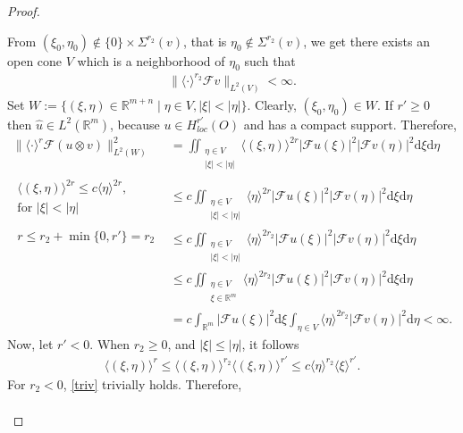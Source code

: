 \documentclass{amsart}
\theoremstyle{definition}
\begin{document}
\begin{proof}
\begin{enumerate}
From $(\xi_0,\eta_0)\notin \{0\} \times \Sigma^{r_2} (v)$, that is $\eta_0 \notin \Sigma^{r_2} (v)$, we get there exists an open cone $V$ which is a neighborhood of $\eta_0$ such that
\begin{align}
\label{eta0}
\lVert \langle\cdot \rangle^{r_2} \mathcal{F} v \rVert_{L^2 (V)}
< \infty.
\end{align}
Set $W:=\{(\xi , \eta) \in \mathbb{R}^{m+n} \mid \eta\in V , |\xi| < |\eta| \}$. Clearly, $(\xi_0,\eta_0)\in W$. If $r'\geq 0$ then $\hat{u}\in L^2 (\mathbb{R}^m)$, because $u\in H_{loc}  ^{r'} (O)$ and has a compact support. Therefore,
\begin{align*}
\lVert \langle \cdot \rangle^{r} \mathcal{F} (u\otimes v)  \rVert_{L^2 (W)} ^2
&= \iint_{\substack{ \eta\in V \\ |\xi|<|\eta| }} \langle (\xi ,\eta) \rangle^{2r} |\mathcal{F}u (\xi)|^2 |\mathcal{F}v (\eta)|^2 \mathrm{d}\xi \mathrm{d}\eta \\
\boxed{\substack{\langle (\xi ,\eta) \rangle^{2r} \leq c \langle \eta \rangle^{2r}, \\ \text{for } |\xi| < |\eta| }}
&\leq c \iint_{\substack{ \eta\in V \\ |\xi|<|\eta| }} \langle \eta \rangle^{2r} |\mathcal{F}u (\xi)|^2 |\mathcal{F}v (\eta)|^2 \mathrm{d}\xi \mathrm{d}\eta\\
\boxed{\substack{ r \leq r_2 + \min \{0,r'\} = r_2 \\ }}
&\leq c \iint_{\substack{ \eta\in V \\ |\xi|<|\eta| }} \langle \eta \rangle^{2r_2} |\mathcal{F}u (\xi)|^2 |\mathcal{F}v (\eta)|^2 \mathrm{d}\xi \mathrm{d}\eta\\
&\leq c \iint_{\substack{ \eta\in V \\ \xi \in \mathbb{R}^m }} \langle \eta \rangle^{2r_2} |\mathcal{F}u (\xi)|^2 |\mathcal{F}v (\eta)|^2 \mathrm{d}\xi \mathrm{d}\eta\\
&= c\int_{\mathbb{R}^m} |\mathcal{F}u (\xi)|^2 \mathrm{d}\xi \int_{\eta\in V} \langle \eta \rangle^{2r_2} |\mathcal{F}v (\eta)|^2 \mathrm{d}\eta
<\infty.
\end{align*}
Now, let $r'<0$. When $r_2 \geq 0 $, and $|\xi|\leq |\eta|$, it follows
\begin{align}
\label{triv}
\langle ( \xi , \eta ) \rangle^r
\leq \langle ( \xi , \eta ) \rangle^{r_2} \langle ( \xi , \eta ) \rangle^{r'}
\leq c \langle \eta \rangle^{r_2} \langle \xi \rangle^{r'}.
\end{align}
For $r_2 < 0$, \eqref{triv} trivially holds. Therefore,
\begin{align*}

\end{align*}
\end{enumerate}
\end{proof}
\end{document}

